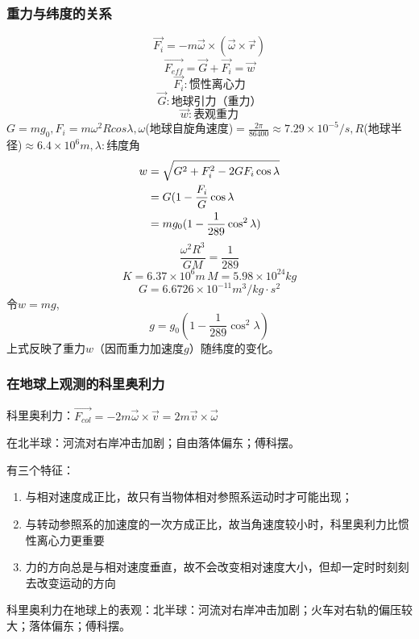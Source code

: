 \subsubsection{重力与纬度的关系}
\[\vec{F_i}=-m\vec{\omega}\times(\vec{\omega}\times\vec{r})\]
\[\vec{F_{eff}}=\vec{G}+\vec{F_i}=\vec{w}\]
\[\vec{F_i}:\text{惯性离心力}\]
\[\vec{G}:\text{地球引力（重力）}\]
\[\vec{w}:\text{表观重力}\]
$G=mg_0,F_i=m\omega^2 R cos\lambda,\omega$(地球自旋角速度)$=\frac{2\pi}{86400}\approx 7.29\times 10^{-5}/s,R$(地球半径)$\approx 6.4\times 10^6 m,\lambda:$纬度角
\begin{align}
w&=\sqrt{G^2+F_i^2-2GF_i \cos \lambda} \notag\\
&=G(1-\frac{F_i}{G}\cos\lambda\notag \\
&=mg_0(1-\frac{1}{289}\cos^2\lambda)\notag
\end{align}
\[\frac{\omega^2 R^3}{GM}=\frac{1}{289}\]
\[K=6.37\times 10^6m\, M=5.98\times 10^24kg\]
\[G=6.6726\times 10^{-11}m^3/kg\cdot s^2\]
令$w=mg$,
\[g=g_0(1-\frac{1}{289}\cos^2\lambda)\]
上式反映了重力$w$（因而重力加速度$g$）随纬度的变化。
\subsubsection{在地球上观测的科里奥利力}
科里奥利力：$\vec{F_{col}}=-2m\vec{\omega}\times\vec{v}=2m\vec{v}\times\vec{\omega}$

在北半球：河流对右岸冲击加剧；自由落体偏东；傅科摆。

有三个特征：
\begin{enumerate}
\item 与相对速度成正比，故只有当物体相对参照系运动时才可能出现；
\item 与转动参照系的加速度的一次方成正比，故当角速度较小时，科里奥利力比惯性离心力更重要
\item 力的方向总是与相对速度垂直，故不会改变相对速度大小，但却一定时时刻刻去改变运动的方向
\end{enumerate}

科里奥利力在地球上的表观：北半球：河流对右岸冲击加剧；火车对右轨的偏压较大；落体偏东；傅科摆。